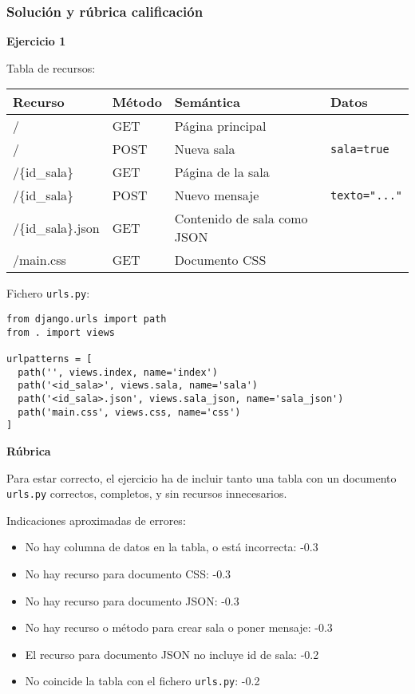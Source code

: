 \newpage

\subsubsection{Solución y rúbrica calificación}

\textbf{Ejercicio 1}

Tabla de recursos:
\vspace{.4cm}

\begin{tabular}{|l|l|l|l|}
  \hline
  Recurso & Método & Semántica & Datos \\ \hline\hline
  /       & GET    & Página principal & \\
  /       & POST   & Nueva sala & \texttt{sala=true} \\
  /\{id\_sala\} & GET & Página de la sala & \\
  /\{id\_sala\} & POST & Nuevo mensaje & \texttt{texto="..."}\\
  /\{id\_sala\}.json & GET & Contenido de sala como JSON & \\
  /main.css & GET & Documento CSS &  \\
  \hline
\end{tabular}


\vspace{.4cm}
Fichero \texttt{urls.py}:

\begin{verbatim}
from django.urls import path
from . import views

urlpatterns = [
  path('', views.index, name='index')
  path('<id_sala>', views.sala, name='sala')
  path('<id_sala>.json', views.sala_json, name='sala_json')
  path('main.css', views.css, name='css')
]
\end{verbatim}

\vspace{.4cm}\textbf{Rúbrica}

Para estar correcto, el ejercicio ha de incluir tanto una tabla con un documento \texttt{urls.py} correctos, completos, y sin recursos innecesarios.

Indicaciones aproximadas de errores:

\begin{itemize}
\item No hay columna de datos en la tabla, o está incorrecta: -0.3
\item No hay recurso para documento CSS: -0.3
\item No hay recurso para documento JSON: -0.3
\item No hay recurso o método para crear sala o poner mensaje: -0.3
\item El recurso para documento JSON no incluye id de sala: -0.2
\item No coincide la tabla con el fichero \texttt{urls.py}: -0.2
\end{itemize}

